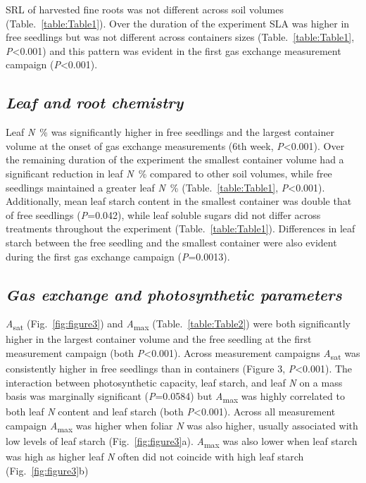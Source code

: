 \documentclass[a4paper]{article}\usepackage[]{graphicx}\usepackage[]{color}
\begin{document}
SRL of harvested fine roots was not different across soil volumes (Table.~\ref{table:Table1}). Over the duration of the experiment SLA was higher in free seedlings but was not different across containers sizes (Table.~\ref{table:Table1}, \textit{P}\textless0.001) and this pattern was evident in the first gas exchange measurement campaign (\textit{P}\textless0.001).

\subsection*{\textit{Leaf and root chemistry}}
Leaf \textit{N}~\% was significantly higher in free seedlings and the largest container volume at the onset of gas exchange measurements (6th week, \textit{P}\textless0.001).  Over the remaining duration of the experiment the smallest container volume had a significant reduction in leaf \textit{N}~\% compared to other soil volumes, while free seedlings maintained a greater leaf \textit{N}~\% (Table.~\ref{table:Table1}, \textit{P}\textless0.001).  Additionally, mean leaf starch content in the smallest container was double that of free seedlings (\textit{P}=0.042), while leaf soluble sugars did not differ across treatments throughout the experiment (Table.~\ref{table:Table1}).  Differences in leaf starch between the free seedling and the smallest container were also evident during the first gas exchange campaign (\textit{P}=0.0013). 

\subsection*{\textit{Gas exchange and photosynthetic parameters}}
\textit{A}\textsubscript{sat} (Fig.~\ref{fig:figure3}) and \textit{A}\textsubscript{max} (Table.~\ref{table:Table2}) were both significantly higher in the largest container volume and the free seedling at the first measurement campaign (both \textit{P}\textless0.001). Across measurement campaigns \textit{A}\textsubscript{sat} was consistently higher in free seedlings than in containers (Figure 3, \textit{P}\textless0.001). The interaction between photosynthetic capacity, leaf starch, and leaf \textit{N} on a mass basis was marginally significant (\textit{P}=0.0584) but \textit{A}\textsubscript{max} was highly correlated to both leaf \textit{N} content and leaf starch (both \textit{P}\textless0.001). Across all measurement campaign \textit{A}\textsubscript{max} was higher when foliar \textit{N} was also higher, usually associated with low levels of leaf starch (Fig.~\ref{fig:figure3}a). \textit{A}\textsubscript{max} was also lower when leaf starch was high as higher leaf \textit{N} often did not coincide with high leaf starch (Fig.~\ref{fig:figure3}b)
\end{document}
